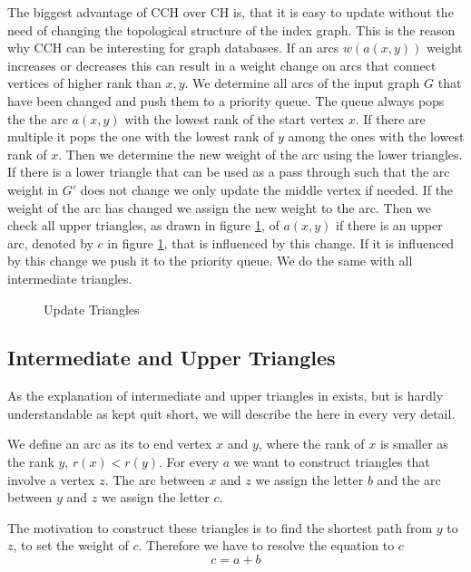 The biggest advantage of CCH over CH is, that it is easy to update without the need of changing the topological structure of the index graph.
This is the reason why CCH can be interesting for graph databases.
If an arcs $w(a(x, y))$ weight increases or decreases this can result in a weight change on arcs that connect vertices of higher rank than $x, y$.
We determine all arcs of the input graph $G$ that have been changed and push them to a priority queue.
The queue always pops the the arc $a(x,y)$ with the lowest rank of the start vertex $x$.
If there are multiple it pops the one with the lowest rank of $y$ among the ones with the lowest rank of $x$.
Then we determine the new weight of the arc using the lower triangles.
If there is a lower triangle that can be used as a pass through such that the arc weight in $G'$ does not change we only update the middle vertex if needed.
If the weight of the arc has changed we assign the new weight to the arc.
Then we check all upper triangles, as drawn in figure \ref{fig:updateTriangles}, of $a(x,y)$ if there is an upper arc, denoted by $c$ in figure \ref{fig:updateTriangles}, that is influenced by this change.
If it is influenced by this change we push it to the priority queue.
We do the same with all intermediate triangles.
\\
\begin{figure}
    \centering
    
    \caption{Update Triangles}
    \label{fig:updateTriangles}
\end{figure}

\subsection{Intermediate and Upper Triangles}

As the explanation of intermediate and upper triangles in \cite[Customization Contraction Hierarchies]{CCH} exists, but is hardly understandable as kept quit short, we will describe the here in every very detail.

We define an arc as its to end vertex $x$ and $y$, where the rank of $x$ is smaller as the rank $y$, $r(x) < r(y)$.
For every $a$ we want to construct triangles that involve a vertex $z$.
The arc between $x$ and $z$ we assign the letter $b$ and the arc between $y$ and $z$ we assign the letter $c$.

The motivation to construct these triangles is to find the shortest path from $y$ to $z$, to set the weight of $c$.
Therefore we have to resolve the equation to $c$
\begin{equation*}
    c = a + b
\end{equation*}

